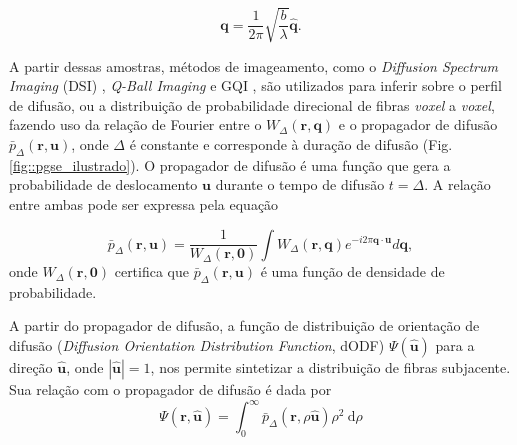 \documentclass[
    12pt,                %
    oneside,            %
    a4paper,            %
    english,            %
    french,                %
    spanish,            %
    brazil                %
    ]{abntex2}
\begin{document}
\begin{equation}
\label{eq::qspace_bvalue}
\mathbf{q} = \frac{1}{2\pi}\sqrt{\frac{b}{\lambda}} \mathbf{\hat{q}}.
\end{equation}

A partir dessas amostras, métodos de imageamento, como o \textit{Diffusion Spectrum Imaging} (DSI) \cite{wedeen2005}, \textit{Q-Ball Imaging} \cite{TuchQBall2004} e GQI \cite{yeh2010}, são utilizados para inferir sobre o perfil de difusão, ou a distribuição de probabilidade direcional de fibras \textit{voxel} a \textit{voxel}, fazendo uso da relação de Fourier entre o $W_{\Delta}(\mathbf{r}, \mathbf{q})$ e o propagador de difusão $\bar{p}_{\Delta}(\mathbf{r}, \mathbf{u})$, onde $\Delta$ é constante e corresponde à duração de difusão (Fig. \ref{fig::pgse_ilustrado}). O propagador de difusão é uma função que gera a probabilidade de deslocamento $\mathbf{u}$ durante o tempo de difusão $t = \Delta$. A relação entre ambas pode ser expressa pela equação \cite{tuch2002}


\begin{equation}
\label{eq::propagator}
    \bar{p}_{\Delta}(\mathbf{r}, \mathbf{u}) =\frac{1}{W_{\Delta}(\mathbf{r},\mathbf{0}) } \int W_{\Delta}(\mathbf{r},\mathbf{q}) e^{-i2 \pi \mathbf{q} \cdot \mathbf{u}} d \mathbf{q} ,
\end{equation}
onde $W_{\Delta}(\mathbf{r},\mathbf{0})$ certifica que $\bar{p}_{\Delta}(\mathbf{r}, \mathbf{u})$ é uma função de densidade de probabilidade.




A partir do propagador de difusão, a função de distribuição de orientação de difusão (\textit{Diffusion Orientation Distribution Function}, dODF) $\Psi(\mathbf{\hat{u}})$ para a direção $\mathbf{\hat{u}}$, onde $|\mathbf{\hat{u}}| = 1$,  nos permite sintetizar a distribuição de fibras subjacente. Sua relação com o propagador de difusão é dada por \cite{tuch2002}
\begin{equation}
\label{eq::dodf_propagador}
\Psi(\mathbf{\mathbf{r},\hat{u}})=\int_{0}^{\infty} \bar{p}_{\Delta}(\mathbf{r}, \rho  \mathbf{\hat{u}}) \rho^2 \mathrm{~d}\rho
\end{equation}
\end{document}
